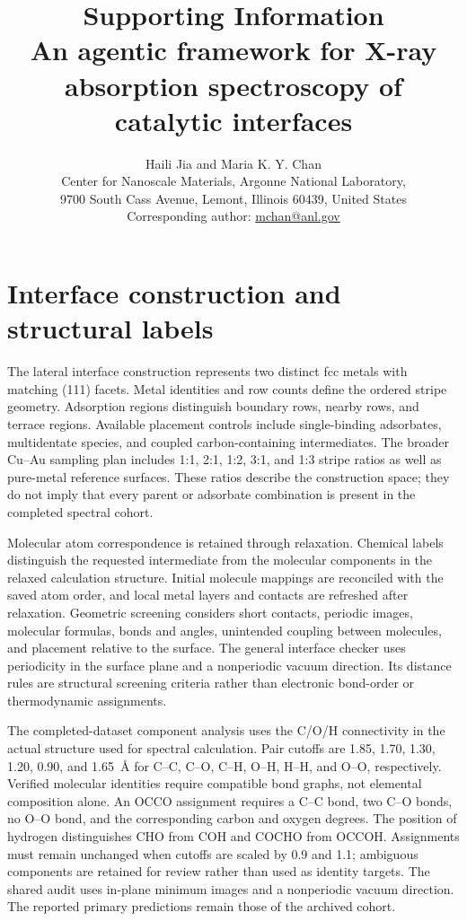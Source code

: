 \documentclass[11pt,a4paper]{article}
\title{Supporting Information\\[0.5em]\large An agentic framework for X-ray absorption spectroscopy of catalytic interfaces}
\author{Haili Jia and Maria K. Y. Chan\\[0.5em]
\small Center for Nanoscale Materials, Argonne National Laboratory,\\
\small 9700 South Cass Avenue, Lemont, Illinois 60439, United States\\
\small Corresponding author: \href{mailto:mchan@anl.gov}{mchan@anl.gov}}
\date{}
\begin{document}
\maketitle
\section{Interface construction and structural labels}
The lateral interface construction represents two distinct fcc metals with matching (111) facets. Metal identities and row counts define the ordered stripe geometry. Adsorption regions distinguish boundary rows, nearby rows, and terrace regions. Available placement controls include single-binding adsorbates, multidentate species, and coupled carbon-containing intermediates. The broader Cu--Au sampling plan includes 1:1, 2:1, 1:2, 3:1, and 1:3 stripe ratios as well as pure-metal reference surfaces. These ratios describe the construction space; they do not imply that every parent or adsorbate combination is present in the completed spectral cohort.

Molecular atom correspondence is retained through relaxation. Chemical labels distinguish the requested intermediate from the molecular components in the relaxed calculation structure. Initial molecule mappings are reconciled with the saved atom order, and local metal layers and contacts are refreshed after relaxation. Geometric screening considers short contacts, periodic images, molecular formulas, bonds and angles, unintended coupling between molecules, and placement relative to the surface. The general interface checker uses periodicity in the surface plane and a nonperiodic vacuum direction. Its distance rules are structural screening criteria rather than electronic bond-order or thermodynamic assignments.

The completed-dataset component analysis uses the C/O/H connectivity in the actual structure used for spectral calculation. Pair cutoffs are 1.85, 1.70, 1.30, 1.20, 0.90, and 1.65~\AA{} for C--C, C--O, C--H, O--H, H--H, and O--O, respectively. Verified molecular identities require compatible bond graphs, not elemental composition alone. An OCCO assignment requires a C--C bond, two C--O bonds, no O--O bond, and the corresponding carbon and oxygen degrees. The position of hydrogen distinguishes CHO from COH and COCHO from OCCOH. Assignments must remain unchanged when cutoffs are scaled by 0.9 and 1.1; ambiguous components are retained for review rather than used as identity targets. The shared audit uses in-plane minimum images and a nonperiodic vacuum direction. The reported primary predictions remain those of the archived cohort.
\end{document}
